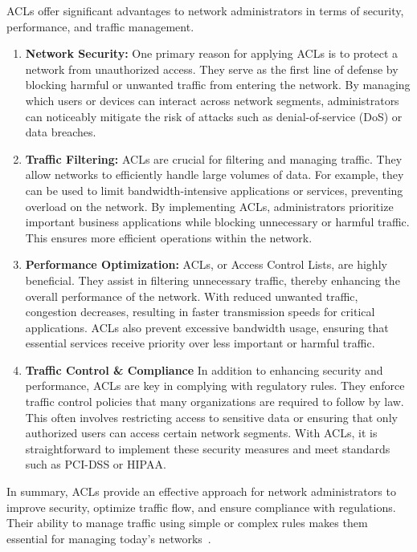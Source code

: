\documentclass[11pt,a4paper]{article}
\begin{document}
        ACLs offer significant advantages to network administrators in terms of security, performance, and traffic management.

        \begin{enumerate}
            \item \textbf{Network Security:} One primary reason for applying ACLs is to protect a network from unauthorized access. They serve as the first line of defense by blocking harmful or unwanted traffic from entering the network. By managing which users or devices can interact across network segments, administrators can noticeably mitigate the risk of attacks such as denial-of-service (DoS) or data breaches.
    
            \item \textbf{Traffic Filtering:} ACLs are crucial for filtering and managing traffic. They allow networks to efficiently handle large volumes of data. For example, they can be used to limit bandwidth-intensive applications or services, preventing overload on the network. By implementing ACLs, administrators prioritize important business applications while blocking unnecessary or harmful traffic. This ensures more efficient operations within the network.
    
            \item \textbf{Performance Optimization:} ACLs, or Access Control Lists, are highly beneficial. They assist in filtering unnecessary traffic, thereby enhancing the overall performance of the network. With reduced unwanted traffic, congestion decreases, resulting in faster transmission speeds for critical applications. ACLs also prevent excessive bandwidth usage, ensuring that essential services receive priority over less important or harmful traffic.

            \item \textbf{Traffic Control \& Compliance} In addition to enhancing security and performance, ACLs are key in complying with regulatory rules. They enforce traffic control policies that many organizations are required to follow by law. This often involves restricting access to sensitive data or ensuring that only authorized users can access certain network segments. With ACLs, it is straightforward to implement these security measures and meet standards such as PCI-DSS or HIPAA.
        \end{enumerate}

        In summary, ACLs provide an effective approach for network administrators to improve security, optimize traffic flow, and ensure compliance with regulations. Their ability to manage traffic using simple or complex rules makes them essential for managing today’s networks~\cite{Implementing}.
\end{document}
